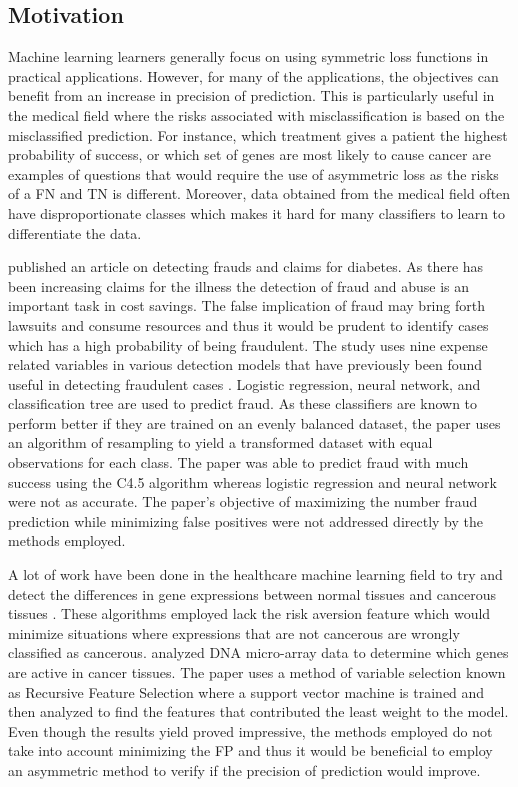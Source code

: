 \documentclass[twoside,11pt]{article}
\begin{document}
\subsection{Motivation}\label{motivation}
 Machine learning learners generally focus on using symmetric loss functions in practical applications. However, for many of the applications, the objectives can benefit from an increase in precision of prediction. This is particularly useful in the medical field where the risks associated with misclassification is based on the misclassified prediction. For instance, which treatment gives a patient the highest probability of success, or which set of genes are most likely to cause cancer are examples of questions that would require the use of asymmetric loss as the risks of a FN and TN is different. Moreover, data obtained from the medical field often have disproportionate classes which makes it hard for many classifiers to learn to differentiate the data. 

\citet{Liou08} published an article on detecting frauds and claims for diabetes. As there has been increasing claims for the illness the detection of fraud and abuse is an important task in cost savings. The false implication of fraud may bring forth lawsuits and consume resources and thus it would be prudent to identify cases which has a high probability of being fraudulent. The study uses nine expense related variables in various detection models that have previously been found useful in detecting fraudulent cases \citep{Yang06}. Logistic regression, neural network, and classification tree are used to predict fraud. As these classifiers are known to perform better if they are trained on an evenly balanced dataset, the paper uses an algorithm of resampling to yield a transformed dataset with equal observations for each class. The paper was able to predict fraud with much success using the C4.5 algorithm whereas logistic regression and neural network were not as accurate. The paper's objective of maximizing the number fraud prediction while minimizing false positives were not addressed directly by the methods employed. 

A lot of work have been done in the healthcare machine learning field to try and detect the differences in gene expressions between normal tissues and cancerous tissues \citep{Ambroise02}\citep{Guyon02}. These algorithms employed lack the risk aversion feature which would minimize situations where expressions that are not cancerous are wrongly classified as cancerous. \citet{Guyon02} analyzed DNA micro-array data to determine which genes are active in cancer tissues. The paper uses a method of variable selection known as Recursive Feature Selection where a support vector machine is trained and then analyzed to find the features that contributed the least weight to the model. Even though the results yield proved impressive, the methods employed do not take into account minimizing the FP and thus it would be beneficial to employ an asymmetric method to verify if the precision of prediction would improve.
\end{document}
